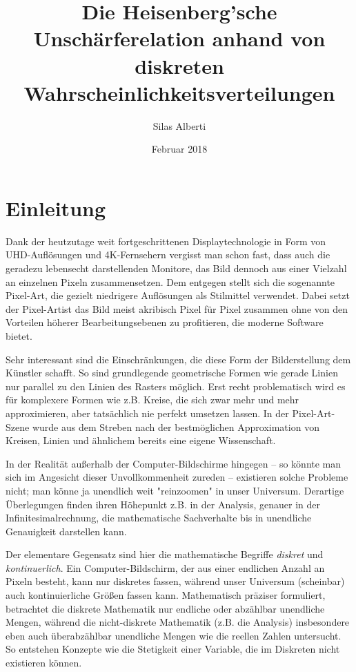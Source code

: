 \documentclass[a4paper,12pt,ngerman]{scrartcl}
\title{Die Heisenberg'sche Unschärferelation anhand von diskreten Wahrscheinlichkeitsverteilungen}
\author{Silas Alberti}
\date{Februar 2018}
\theoremstyle{plain}
\theoremstyle{plain}
\begin{document}
\maketitle

\tableofcontents

\thispagestyle{empty}
\clearpage
\setcounter{page}{1}

\section{Einleitung}

Dank der heutzutage weit fortgeschrittenen Displaytechnologie in Form von UHD-Auflösungen und 4K-Fernsehern vergisst man schon fast, dass auch die geradezu lebensecht darstellenden Monitore, das Bild dennoch aus einer Vielzahl an einzelnen Pixeln zusammensetzen. Dem entgegen stellt sich die sogenannte Pixel-Art, die gezielt niedrigere Auflösungen als Stilmittel verwendet. Dabei setzt der Pixel-Artist das Bild meist akribisch Pixel für Pixel zusammen ohne von den Vorteilen höherer Bearbeitungsebenen zu profitieren, die moderne Software bietet.


Sehr interessant sind die Einschränkungen, die diese Form der Bilderstellung dem Künstler schafft. So sind grundlegende geometrische Formen wie gerade Linien nur parallel zu den Linien des Rasters möglich. Erst recht problematisch wird es für komplexere Formen wie z.B. Kreise, die sich zwar mehr und mehr approximieren, aber tatsächlich nie perfekt umsetzen lassen. In der Pixel-Art-Szene wurde aus dem Streben nach der bestmöglichen Approximation von Kreisen, Linien und ähnlichem bereits eine eigene Wissenschaft.


In der Realität außerhalb der Computer-Bildschirme hingegen -- so könnte man sich im Angesicht dieser Unvollkommenheit zureden -- existieren solche Probleme nicht; man könne ja unendlich weit "reinzoomen" in unser Universum. Derartige Überlegungen finden ihren Höhepunkt z.B. in der Analysis, genauer in der Infinitesimalrechnung, die mathematische Sachverhalte bis in unendliche Genauigkeit darstellen kann. 

Der elementare Gegensatz sind hier die mathematische Begriffe \textit{diskret} und \textit{kontinuerlich}. Ein Computer-Bildschirm, der aus einer endlichen Anzahl an Pixeln besteht, kann nur diskretes fassen, während unser Universum (scheinbar) auch kontinuierliche Größen fassen kann. Mathematisch präziser formuliert, betrachtet die diskrete Mathematik nur endliche oder abzählbar unendliche Mengen, während die nicht-diskrete Mathematik (z.B. die Analysis) insbesondere eben auch überabzählbar unendliche Mengen wie die reellen Zahlen untersucht. So entstehen Konzepte wie die Stetigkeit einer Variable, die im Diskreten nicht existieren können.
\end{document}
